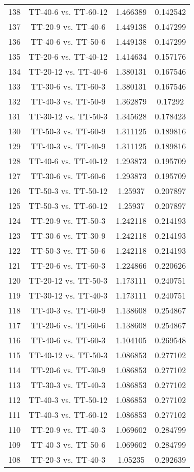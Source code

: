 \documentclass[a4paper,10pt]{article}
\begin{document}
\begin{landscape}
\begin{table}[!htp]
\begin{tabular}{cccc}
138&TT-40-6 vs. TT-60-12&1.466389&0.142542\\
137&TT-20-9 vs. TT-40-6&1.449138&0.147299\\
136&TT-40-6 vs. TT-50-6&1.449138&0.147299\\
135&TT-20-6 vs. TT-40-12&1.414634&0.157176\\
134&TT-20-12 vs. TT-40-6&1.380131&0.167546\\
133&TT-30-6 vs. TT-60-3&1.380131&0.167546\\
132&TT-40-3 vs. TT-50-9&1.362879&0.17292\\
131&TT-30-12 vs. TT-50-3&1.345628&0.178423\\
130&TT-50-3 vs. TT-60-9&1.311125&0.189816\\
129&TT-40-3 vs. TT-40-9&1.311125&0.189816\\
128&TT-40-6 vs. TT-40-12&1.293873&0.195709\\
127&TT-30-6 vs. TT-60-6&1.293873&0.195709\\
126&TT-50-3 vs. TT-50-12&1.25937&0.207897\\
125&TT-50-3 vs. TT-60-12&1.25937&0.207897\\
124&TT-20-9 vs. TT-50-3&1.242118&0.214193\\
123&TT-30-6 vs. TT-30-9&1.242118&0.214193\\
122&TT-50-3 vs. TT-50-6&1.242118&0.214193\\
121&TT-20-6 vs. TT-60-3&1.224866&0.220626\\
120&TT-20-12 vs. TT-50-3&1.173111&0.240751\\
119&TT-30-12 vs. TT-40-3&1.173111&0.240751\\
118&TT-40-3 vs. TT-60-9&1.138608&0.254867\\
117&TT-20-6 vs. TT-60-6&1.138608&0.254867\\
116&TT-40-6 vs. TT-60-3&1.104105&0.269548\\
115&TT-40-12 vs. TT-50-3&1.086853&0.277102\\
114&TT-20-6 vs. TT-30-9&1.086853&0.277102\\
113&TT-30-3 vs. TT-40-3&1.086853&0.277102\\
112&TT-40-3 vs. TT-50-12&1.086853&0.277102\\
111&TT-40-3 vs. TT-60-12&1.086853&0.277102\\
110&TT-20-9 vs. TT-40-3&1.069602&0.284799\\
109&TT-40-3 vs. TT-50-6&1.069602&0.284799\\
108&TT-20-3 vs. TT-40-3&1.05235&0.292639\\

\end{tabular}
\end{table}
\end{landscape}
\end{document}
